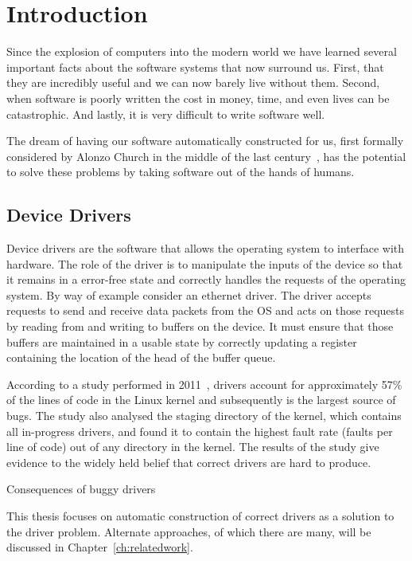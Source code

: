 \chapter{Introduction}

Since the explosion of computers into the modern world we have learned several important facts about the software systems that now surround us. First, that they are incredibly useful and we can now barely live without them. Second, when software is poorly written the cost in money, time, and even lives can be catastrophic. And lastly, it is very difficult to write software well.

The dream of having our software automatically constructed for us, first formally considered by Alonzo Church in the middle of the last century~\cite{Church62}, has the potential to solve these problems by taking software out of the hands of humans. 

\section{Device Drivers}

Device drivers are the software that allows the operating system to interface
with hardware. The role of the driver is to manipulate the inputs of the device
so that it remains in a error-free state and correctly handles the requests of
the operating system. By way of example consider an ethernet driver. The driver
accepts requests to send and receive data packets from the OS and acts on those
requests by reading from and writing to buffers on the device. It must ensure
that those buffers are maintained in a usable state by correctly updating a
register containing the location of the head of the buffer queue.

According to a study performed in 2011~\cite{Palix11}, drivers account for
approximately 57\% of the lines of code in the Linux kernel and subsequently is
the largest source of bugs. The study also analysed the staging directory of
the kernel, which contains all in-progress drivers, and found it to contain the
highest fault rate (faults per line of code) out of any directory in the
kernel. The results of the study give evidence to the widely held belief that
correct drivers are hard to produce.

Consequences of buggy drivers

This thesis focuses on automatic construction of correct drivers as a solution
to the driver problem. Alternate approaches, of which there are many, will be
discussed in Chapter~\ref{ch:relatedwork}.

